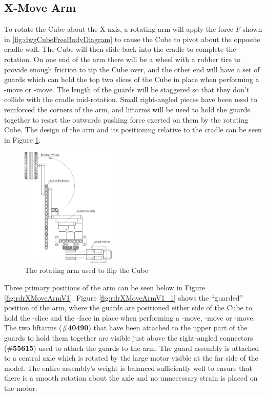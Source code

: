 \documentclass{report}
\newcommand{\tbo}[1]{\textbf{#1}}
\newcommand{\legopiece}[1]{(\#\tbo{#1})}
\newcommand{\face}[1]{\uppercase{\texttt{\formatmovesnospace{#1}}}-face}
\newcommand{\move}[1]{\uppercase{\texttt{\formatmovesnospace{#1}}}-move}
\newcommand{\slice}[1]{\uppercase{\texttt{\formatmovesnospace{#1}}}-slice}
\begin{document}
    \subsection{X-Move Arm}
    
    To rotate the Cube about the X axis, a rotating arm will apply the force $F$ shown in \ref{fig:dwgCubeFreeBodyDiagram} to cause the Cube to pivot about the opposite cradle wall. The Cube will then slide back into the cradle to complete the rotation. On one end of the arm there will be a wheel with a rubber tire to provide enough friction to tip the Cube over, and the other end will have a set of guards which can hold the top two slices of the Cube in place when performing a \move{D} or \move{d'}. The length of the guards will be staggered so that they don't collide with the cradle mid-rotation. Small right-angled pieces have been used to reinforced the corners of the arm, and liftarms will be used to hold the guards together to resist the outwards pushing force exerted on them by the rotating Cube. The design of the arm and its positioning relative to the cradle can be seen in Figure \ref{fig:dwgRotatingArm}.
    
    \begin{figure}[H]
    	\centering
   		\includegraphics[width=0.4\textwidth]{Resources/Images/dwgRotatingArm.png}
   		\caption{The rotating arm used to flip the Cube}
   		\label{fig:dwgRotatingArm}
    \end{figure}

	Three primary positions of the arm can be seen below in Figure \ref{fig:rdrXMoveArmV1}. Figure \ref{fig:rdrXMoveArmV1_1} shows the \enquote{guarded} position of the arm, where the guards are positioned either side of the Cube to hold the \slice{l-r} and the \face{U} in place when performing a \move{D}, \move{D'} or \move{D2}. The two liftarms \legopiece{40490} that have been attached to the upper part of the guards to hold them together are visible just above the right-angled connectors \legopiece{55615} used to attach the guards to the arm. The guard assembly is attached to a central axle which is rotated by the large motor visible at the far side of the model. The entire assembly's weight is balanced sufficiently well to ensure that there is a smooth rotation about the axle and no unnecessary strain is placed on the motor.
\end{document}
